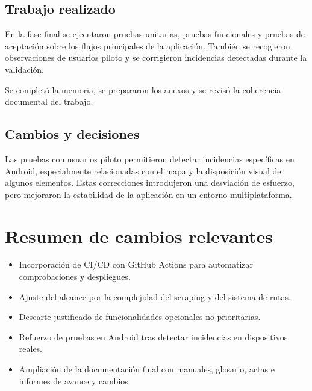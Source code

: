 \subsection{Trabajo realizado}

En la fase final se ejecutaron pruebas unitarias, pruebas funcionales y pruebas de aceptación sobre los flujos principales de la aplicación. También se recogieron observaciones de usuarios piloto y se corrigieron incidencias detectadas durante la validación.

Se completó la memoria, se prepararon los anexos y se revisó la coherencia documental del trabajo.

\subsection{Cambios y decisiones}

Las pruebas con usuarios piloto permitieron detectar incidencias específicas en Android, especialmente relacionadas con el mapa y la disposición visual de algunos elementos. Estas correcciones introdujeron una desviación de esfuerzo, pero mejoraron la estabilidad de la aplicación en un entorno multiplataforma.

\section{Resumen de cambios relevantes}

\begin{itemize}
    \item Incorporación de CI/CD con GitHub Actions para automatizar comprobaciones y despliegues.
    \item Ajuste del alcance por la complejidad del scraping y del sistema de rutas.
    \item Descarte justificado de funcionalidades opcionales no prioritarias.
    \item Refuerzo de pruebas en Android tras detectar incidencias en dispositivos reales.
    \item Ampliación de la documentación final con manuales, glosario, actas e informes de avance y cambios.
\end{itemize}
